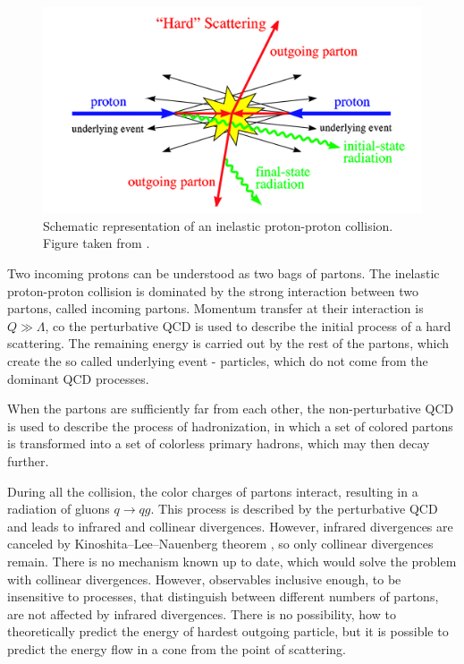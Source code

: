 \begin{figure}[t]
  \centering
  \includegraphics[width=\textwidth]{Chapter2/HardProcess.png}
  \caption[Schematic representation of an inelastic proton-proton
          collision.]
          {Schematic representation of an inelastic proton-proton
          collision. Figure taken from \cite{HardProcess}.}
  \label{fig:HardProcess}
\end{figure}

Two incoming protons can be understood as two bags of partons. 
The inelastic proton-proton collision is dominated by the strong interaction
between two partons, called incoming partons. 
Momentum transfer at their interaction is $Q \gg \Lambda$, co the perturbative
QCD is used to describe the initial process of a hard scattering. 
The remaining energy is carried out by the rest of the partons, which create the so
called underlying event - particles, which do not come from the dominant QCD
processes.

When the partons are sufficiently far from each other, the non-perturbative QCD is
used to describe the process of hadronization, in which a set of colored
partons is transformed into a set of colorless primary hadrons, which may then
decay further. 

During all the collision, the color charges of partons interact, resulting in a
radiation of gluons $q \rightarrow qg$. This process is described by the
perturbative QCD and leads to infrared and collinear divergences. However,
infrared divergences are
canceled by Kinoshita--Lee--Nauenberg theorem \cite{KLN1,KLN2}, so only
collinear divergences remain. There is no mechanism known up to date, which
would solve the problem with collinear divergences. However, observables
inclusive enough, to be insensitive to processes, that distinguish between
different numbers of partons, are not affected by infrared divergences.
There is no possibility, how to theoretically predict the energy of hardest
outgoing particle, but it is possible to predict the energy flow in a cone from
the point of scattering.

